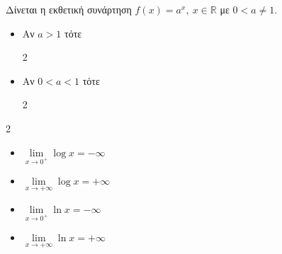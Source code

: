 Δίνεται η εκθετική συνάρτηση $f(x)=a^x,\ x\in\mathbb{R}$ με $0<a\neq 1$.
\begin{itemize}
\item Αν $a>1$ τότε
\begin{multicols}{2}
\end{multicols}
\item Αν $0<a<1$ τότε
\begin{multicols}{2}
\end{multicols}
\end{itemize}

\begin{multicols}{2}
\begin{itemize}
\item $\lim\limits_{x\to0^+}{\log{x}}=-\infty$
\item $\lim\limits_{x\to+\infty}{\log{x}}=+\infty$
\item $\lim\limits_{x\to0^+}{\ln{x}}=-\infty$
\item $\lim\limits_{x\to+\infty}{\ln{x}}=+\infty$
\end{itemize}
\end{multicols}

